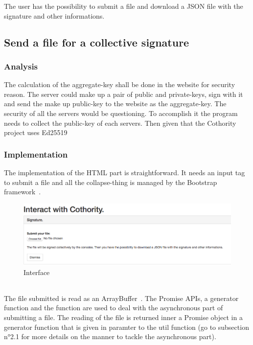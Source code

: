 \documentclass[11pt, a4paper, twoside, openright]{book} %
\begin{document}
The user has the possibility to submit a file and download a JSON file with the
signature and other informations.\\

\subsection{Send a file for a collective signature}

\subsubsection{Analysis}
The calculation of the aggregate-key shall be done in the website for security reason.
The server could make up a pair of public and private-keys, sign with it and send
the make up public-key to the website as the aggregate-key. The security of all
the servers would be questioning.
To accomplish it the program needs to collect the public-key of each servers.
Then given that the Cothority project uses Ed25519 %

\subsubsection{Implementation}
The implementation of the HTML part is straightforward. It needs an input tag to
submit a file and all the collapse-thing is managed by the Bootstrap framework~\cite{bootstrap}.\\

\begin{figure}[ht!]
\centering
\includegraphics[width=125mm]{verification_signature.jpg}
\caption{Interface}
\end{figure}
\leavevmode \\

The file submitted is read as an ArrayBuffer~\cite{ArrayBuffer}. The Promise APIs,
a generator function and the  function are used to deal with
the asynchronous part of submitting a file. The reading of the file is returned
inner a Promise object in a generator function that is given in paramter to the
 util function (go to subsection n°2.1 for more details on
the manner to tackle the asynchronous part).\\ %
\end{document}
